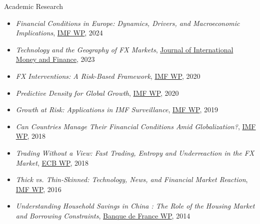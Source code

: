 \documentclass[usegeometry, 10pt, a4paper]{cv} %
\begin{document}
\begin{rubriquetableau}[0.95\textwidth]{Academic Research}\\
  \vspace{-0.8cm}
  \begin{itemize}
  \item \textit{Financial Conditions in Europe: Dynamics, Drivers, and Macroeconomic Implications}, \href{https://www.imf.org/en/Publications/WP/Issues/2023/09/29/Financial-Conditions-in-Europe-Dynamics-Drivers-and-Macroeconomic-Implications-539653}{IMF WP}, 2024
  \item \textit{Technology and the Geography of FX Markets}, \href{https://www.sciencedirect.com/science/article/abs/pii/S0261560623000037}{Journal of International Money and Finance}, 2023
  \item \textit{FX Interventions: A Risk-Based Framework}, \href{https://www.imf.org/en/Publications/WP/Issues/2021/02/12/Foreign-Exchange-Intervention-Rules-for-Central-Banks-A-Risk-based-Framework-50081}{IMF WP}, 2020
  \item \textit{Predictive Density for Global Growth}, \href{https://www.imf.org/en/Publications/WP/Issues/2020/05/29/Predictive-Density-Aggregation-A-Model-for-Global-GDP-Growth-49441}{IMF WP}, 2020
  \item \textit{Growth at Risk: Applications in IMF Surveillance}, \href{https://www.imf.org/en/Publications/WP/Issues/2019/02/21/Growth-at-Risk-Concept-and-Application-in-IMF-Country-Surveillance-46567}{IMF WP}, 2019
  \item \textit{Can Countries Manage Their Financial Conditions Amid Globalization?}, \href{https://www.imf.org/en/Publications/WP/Issues/2018/01/24/Can-Countries-Manage-Their-Financial-Conditions-Amid-Globalization-45581}{IMF WP}, 2018
  \item \textit{Trading Without a View: Fast Trading, Entropy and Underreaction in the FX  Market}, \href{https://cepr.org/voxeu/columns/fast-trading-and-virtue-entropy}{ECB WP}, 2018
  \item \textit{Thick vs. Thin-Skinned: Technology, News, and Financial Market Reaction}, \href{https://www.imf.org/en/Publications/WP/Issues/2017/04/07/Thick-vs-44810}{IMF WP}, 2016 
  \item \textit{Understanding Household Savings in China : The Role of the Housing Market and Borrowing Constraints}, \href{https://ideas.repec.org/p/pra/mprapa/44611.html}{Banque de France WP}, 2014 
  \end{itemize}
\end{rubriquetableau}
\end{document}
